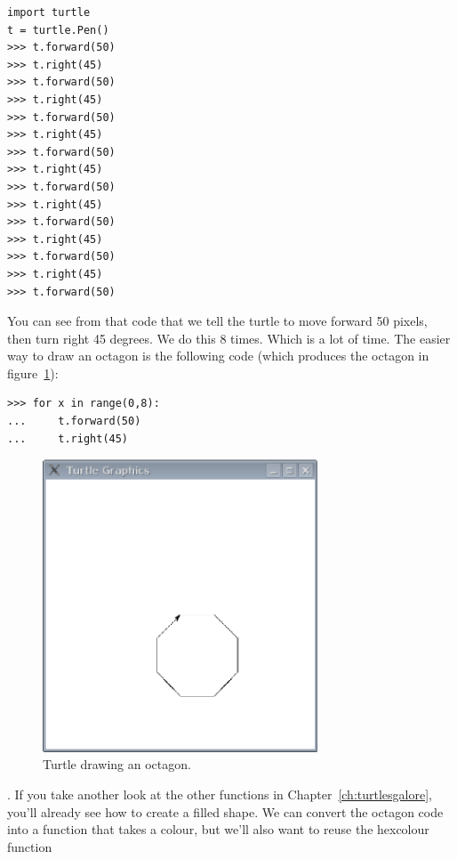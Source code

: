\begin{listing}
\begin{verbatim}
import turtle
t = turtle.Pen()
>>> t.forward(50)
>>> t.right(45)
>>> t.forward(50)
>>> t.right(45)
>>> t.forward(50)
>>> t.right(45)
>>> t.forward(50)
>>> t.right(45)
>>> t.forward(50)
>>> t.right(45)
>>> t.forward(50)
>>> t.right(45)
>>> t.forward(50)
>>> t.right(45)
>>> t.forward(50)
\end{verbatim}
\end{listing}

\noindent
You can see from that code that we tell the turtle to move forward 50 pixels, then turn right 45 degrees.  We do this 8 times.  Which is a lot of time.  The easier way to draw an octagon is the following code (which produces the octagon in figure~\ref{fig48}):

\begin{listing}
\begin{verbatim}
>>> for x in range(0,8):
...     t.forward(50)
...     t.right(45)
\end{verbatim}
\end{listing}

\begin{figure}
\begin{center}
\includegraphics[width=82mm]{eps/figure48.eps}
\end{center}
\caption{Turtle drawing an octagon.}\label{fig48}
\end{figure}

.  If you take another look at the other functions in Chapter~\ref{ch:turtlesgalore}, you'll already see how to create a filled shape. We can convert the octagon code into a function that takes a colour, but we'll also want to reuse the hexcolour function 

